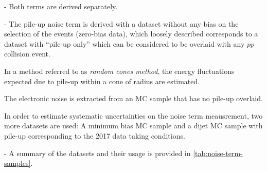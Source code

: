 - Both terms are derived separately.

- The pile-up noise term is derived with a dataset without any bias on the selection of the events (zero-bias data), which loosely described corresponds to a dataset with ``pile-up only'' which can be considered to be overlaid with any $pp$ collision event.

In a method referred to as \emph{random cones method}, the energy fluctuations expected due to pile-up within a cone of radius \Rrandomcone are estimated.

The electronic noise is extracted from an MC sample that has no pile-up overlaid.

In order to estimate systematic uncertainties on the noise term meausrement, two more datasets are used: A minimum bias MC sample and a dijet MC sample with pile-up corresponding to the 2017 data taking conditions.

- A summary of the datasets and their usage is provided in \cref{tab:noise-term-samples}.




